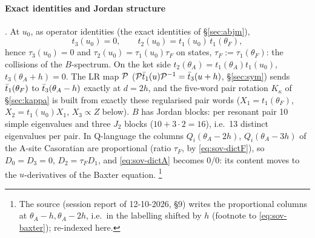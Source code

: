\paragraph{Exact identities and Jordan structure} \ex. At $u_0$, as operator identities (the exact identities of \S\ref{sec:abjm}),
\begin{equation}\label{eq:sov-ident}
 t_3(u_0)=0,\qquad t_2(u_0)=t_1(u_0)\,t_1(\theta_F),
\end{equation}
hence $\tau_3(u_0)=0$ and $\tau_2(u_0)=\tau_1(u_0)\tau_F$ on states, $\tau_F:=\tau_1(\theta_F)$: the collisions of the $B$-spectrum. On the ket side $t_2(\theta_A)=t_1(\theta_A)t_1(u_0)$, $t_3(\theta_A+h)=0$.
The LR map $\mathcal P$ ($\mathcal P\bar t_1(u)\mathcal P^{-1}=\bar t_3(u+h)$, \S\ref{sec:sym}) sends $\bar t_1(\theta_F)$ to $\bar t_3(\theta_A-h)$ exactly at $d=2h$, and the five-word pair rotation $K_\kappa$ of \S\ref{sec:kappa} is built from exactly these
regularised pair words ($X_1=t_1(\theta_F)$, $X_2=t_1(u_0)X_1$, $X_3\propto Z$ below). $B$ has Jordan blocks: per resonant pair 10 simple eigenvalues and three $J_2$ blocks ($10+3\cdot2=16$), i.e.\ 13 distinct
eigenvalues per pair. In Q-language the columns $Q_i(\theta_A-2h)$, $Q_i(\theta_A-3h)$ of the A-site Casoratian are proportional (ratio $\tau_F$, by \eqref{eq:sov-dictF}), so $D_0=D_3=0$, $D_2=\tau_FD_1$, and
\eqref{eq:sov-dictA} becomes $0/0$: its content moves to the $u$-derivatives of the Baxter equation.%
\footnote{The source (session report of 12-10-2026, \S9) writes the proportional columns at $\theta_A-h,\theta_A-2h$, i.e.\ in the labelling shifted by $h$ (footnote to \eqref{eq:sov-baxter}); re-indexed here.}

